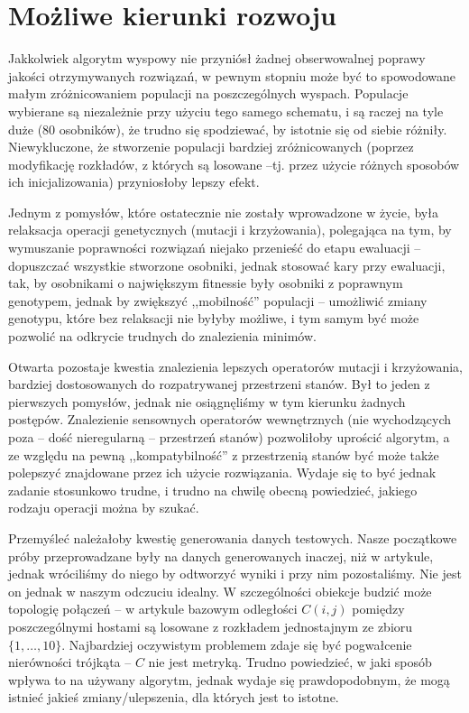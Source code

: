 \documentclass[11pt,pdftex,a4paper]{scrartcl}
\begin{document}
\section{Możliwe kierunki rozwoju}

Jakkolwiek algorytm wyspowy nie przyniósł żadnej obserwowalnej poprawy jakości otrzymywanych rozwiązań,
w pewnym stopniu może być to spowodowane małym zróżnicowaniem populacji na poszczególnych wyspach.
Populacje wybierane są niezależnie przy użyciu tego samego schematu, i są raczej na tyle duże (80
osobników), że trudno się spodziewać, by istotnie się od siebie różniły. Niewykluczone, że stworzenie
populacji bardziej zróżnicowanych (poprzez modyfikację rozkładów, z których są losowane --tj. przez
użycie różnych sposobów ich inicjalizowania) przyniosłoby lepszy efekt.

Jednym z pomysłów, które ostatecznie nie zostały wprowadzone w życie, była relaksacja operacji
genetycznych (mutacji i krzyżowania), polegająca na tym, by wymuszanie poprawności rozwiązań niejako
przenieść do etapu ewaluacji -- dopuszczać wszystkie stworzone osobniki, jednak stosować kary przy
ewaluacji, tak, by osobnikami o największym fitnessie były osobniki z poprawnym genotypem, jednak by
zwiększyć ,,mobilność'' populacji -- umożliwić zmiany genotypu, które bez relaksacji nie byłyby 
możliwe, i tym samym być może pozwolić na odkrycie trudnych do znalezienia minimów.

Otwarta pozostaje kwestia znalezienia lepszych operatorów mutacji i krzyżowania, bardziej dostosowanych
do rozpatrywanej przestrzeni stanów. Był to jeden z pierwszych pomysłów, jednak nie osiągnęliśmy w tym
kierunku żadnych postępów. Znalezienie sensownych operatorów wewnętrznych (nie wychodzących poza --
dość nieregularną -- przestrzeń stanów) pozwoliłoby uprościć algorytm, a ze względu na pewną 
,,kompatybilność'' z przestrzenią stanów być może także polepszyć znajdowane przez ich użycie 
rozwiązania. Wydaje się to być jednak zadanie stosunkowo trudne, i trudno na chwilę obecną powiedzieć,
jakiego rodzaju operacji można by szukać.

Przemyśleć należałoby kwestię generowania danych testowych. Nasze początkowe próby przeprowadzane
były na danych generowanych inaczej, niż w artykule, jednak wróciliśmy do niego by odtworzyć wyniki
i przy nim pozostaliśmy. Nie jest on jednak w naszym odczuciu idealny. W szczególności obiekcje 
budzić może topologię połączeń -- w artykule bazowym odległości \(C(i,j)\) pomiędzy poszczególnymi
hostami są losowane z rozkładem jednostajnym ze zbioru \(\{1,\ldots,10\}\). Najbardziej oczywistym
problemem zdaje się być pogwałcenie nierówności trójkąta -- \(C\) nie jest metryką. Trudno powiedzieć,
w jaki sposób wpływa to na używany algorytm, jednak wydaje się prawdopodobnym, że mogą istnieć jakieś
zmiany/ulepszenia, dla których jest to istotne. 
\end{document}
